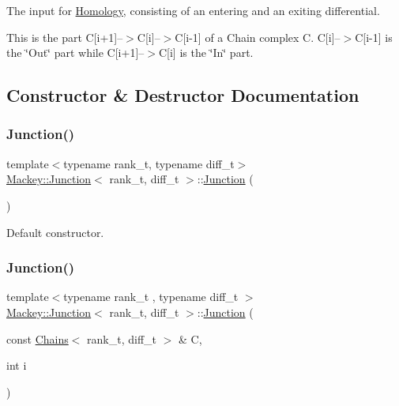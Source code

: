 The input for \hyperlink{classMackey_1_1Homology}{Homology}, consisting of an entering and an exiting differential. 

This is the part C\mbox{[}i+1\mbox{]}--$>$C\mbox{[}i\mbox{]}--$>$C\mbox{[}i-\/1\mbox{]} of a Chain complex C. C\mbox{[}i\mbox{]}--$>$C\mbox{[}i-\/1\mbox{]} is the \char`\"{}\+Out\char`\"{} part while C\mbox{[}i+1\mbox{]}--$>$C\mbox{[}i\mbox{]} is the \char`\"{}\+In\char`\"{} part. 

\subsection{Constructor \& Destructor Documentation}
\mbox{\label{classMackey_1_1Junction_a943b60d8e77594e4b19da7a5e40cb62e}} 
\subsubsection{\texorpdfstring{Junction()}{Junction()}\hspace{0.1cm}{\footnotesize\ttfamily [1/3]}}
{\footnotesize\ttfamily template$<$typename rank\+\_\+t, typename diff\+\_\+t$>$ \\
\hyperlink{classMackey_1_1Junction}{Mackey\+::\+Junction}$<$ rank\+\_\+t, diff\+\_\+t $>$\+::\hyperlink{classMackey_1_1Junction}{Junction} (\begin{DoxyParamCaption}{ }\end{DoxyParamCaption})\hspace{0.3cm}{\ttfamily [inline]}}



Default constructor. 

\mbox{\label{classMackey_1_1Junction_ae6e36887e5bd3be8fe6175a501c749db}} 
\subsubsection{\texorpdfstring{Junction()}{Junction()}\hspace{0.1cm}{\footnotesize\ttfamily [2/3]}}
{\footnotesize\ttfamily template$<$typename rank\+\_\+t , typename diff\+\_\+t $>$ \\
\hyperlink{classMackey_1_1Junction}{Mackey\+::\+Junction}$<$ rank\+\_\+t, diff\+\_\+t $>$\+::\hyperlink{classMackey_1_1Junction}{Junction} (\begin{DoxyParamCaption}\item[{const \hyperlink{classMackey_1_1Chains}{Chains}$<$ rank\+\_\+t, diff\+\_\+t $>$ \&}]{C,  }\item[{int}]{i }\end{DoxyParamCaption})}




